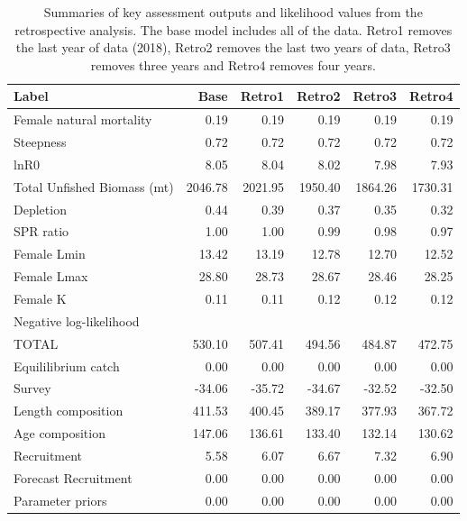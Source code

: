 \documentclass[12pt,]{article}
\begin{document}
\begin{table}[ht]
\centering
\caption{Summaries of key assessment outputs 
                                              and likelihood values from the retrospective 
                                              analysis. The base model includes all of the data.  Retro1 
                                             removes the last year of data (2018), Retro2 removes the last 
                                             two years of data, Retro3 removes three years and Retro4 
                                             removes four years.} 
\label{tab:retro}
\begin{tabular}{lrrrrr}
  \hline
Label & Base & Retro1 & Retro2 & Retro3 & Retro4 \\ 
  \hline
Female natural mortality & 0.19 & 0.19 & 0.19 & 0.19 & 0.19 \\ 
  Steepness & 0.72 & 0.72 & 0.72 & 0.72 & 0.72 \\ 
  lnR0 & 8.05 & 8.04 & 8.02 & 7.98 & 7.93 \\ 
  Total Unfished Biomass (mt) & 2046.78 & 2021.95 & 1950.40 & 1864.26 & 1730.31 \\ 
  Depletion & 0.44 & 0.39 & 0.37 & 0.35 & 0.32 \\ 
  SPR ratio & 1.00 & 1.00 & 0.99 & 0.98 & 0.97 \\ 
  Female Lmin & 13.42 & 13.19 & 12.78 & 12.70 & 12.52 \\ 
  Female Lmax & 28.80 & 28.73 & 28.67 & 28.46 & 28.25 \\ 
  Female K & 0.11 & 0.11 & 0.12 & 0.12 & 0.12 \\ 
  Negative log-likelihood &  &  &  &  &  \\ 
  TOTAL & 530.10 & 507.41 & 494.56 & 484.87 & 472.75 \\ 
  Equililibrium catch & 0.00 & 0.00 & 0.00 & 0.00 & 0.00 \\ 
  Survey & -34.06 & -35.72 & -34.67 & -32.52 & -32.50 \\ 
  Length composition & 411.53 & 400.45 & 389.17 & 377.93 & 367.72 \\ 
  Age composition & 147.06 & 136.61 & 133.40 & 132.14 & 130.62 \\ 
  Recruitment & 5.58 & 6.07 & 6.67 & 7.32 & 6.90 \\ 
  Forecast Recruitment & 0.00 & 0.00 & 0.00 & 0.00 & 0.00 \\ 
  Parameter priors & 0.00 & 0.00 & 0.00 & 0.00 & 0.00 \\ 
   \hline
\end{tabular}
\end{table}
\end{document}
